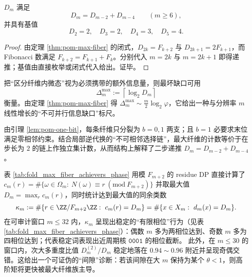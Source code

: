 \begin{corollary}[二步递推与基值]\label{cor:pom-D-rec}
$D_m$ 满足
\[
D_m=D_{m-2}+D_{m-4}\qquad(m\ge 6),
\]
并具有基值
\[
D_2=2,\quad D_3=2,\quad D_4=3,\quad D_5=4.
\]
\end{corollary}
\begin{proof}
由定理 \ref{thm:pom-max-fiber} 的闭式，$D_{2k}=F_{k+2}$ 与 $D_{2k+1}=2F_{k+1}$，而 Fibonacci 数满足 $F_{k+2}=F_{k+1}+F_k$。分别代入 $m=2k$ 与 $m=2k+1$ 即得递推；基值由直接枚举或闭式代入给出。证毕。
\end{proof}

\begin{remark}[最坏投影缺口的比特量化]\label{rem:pom-D-delay}
把“区分纤维内微态”视为必须携带的额外信息量，则最坏缺口可用
\[
\Delta_m^{\max}:=\left\lceil \log_2 D_m\right\rceil
\]
衡量。由定理 \ref{thm:pom-max-fiber} 得
\(
\Delta_m^{\max}\sim \frac{m}{2}\log_2\varphi
\)，它给出一种与分辨率 $m$ 线性增长的“不可并行信息缺口”标尺。
\end{remark}

\begin{remark}[一比特溢出与二步递推的结构来源]\label{rem:pom-overflow-rec}
由引理 \ref{lem:pom-one-bit}，每条纤维只分裂为 $b=0,1$ 两支；且 $b=1$ 必要求末位满足零相邻约束。结合局部逆代换的“不可相邻选择链”，最大纤维的计数等价于在步长为 $2$ 的链上作独立集计数，从而结构上解释了二步递推 $D_m=D_{m-2}+D_{m-4}$。
\end{remark}




\begin{remark}\label{rem:pom-max-fiber-achievers-phase}
表 \ref{tab:fold_max_fiber_achievers_phase} 用模 \(F_{m+2}\) 的 residue DP 直接计算了
\(
c_m(r)=\#\{\omega\in\Omega_m:\ N(\omega)\equiv r\ (\mathrm{mod}\ F_{m+2})\}
\)
并取最大值 \(D_m=\max_r c_m(r)\)，同时统计达到最大值的同余类数
\[
\kappa_m:=\#\{r\in\ZZ/F_{m+2}\ZZ:\ c_m(r)=D_m\}
=\#\{x\in X_m:\ d_m(x)=D_m\}.
\]
在可审计窗口 \(m\le 32\) 内，\(\kappa_m\) 呈现出稳定的“有限相位”行为（见表 \ref{tab:fold_max_fiber_achievers_phase}）：偶数 \(m\) 多为两相位达到、奇数 \(m\) 多为四相位达到；代表稳定词表现出近周期核 \(\texttt{0001}\) 的相位截断。
此外，在 \(m\le 30\) 的窗口内，次大多重度比值 \(D_m^{(2)}/D_m\) 稳定地落在 \(0.94\sim 0.96\) 附近并呈现奇偶交错。这给出一个可证伪的“间隙”诊断：若该间隙在大 \(m\) 保持为某个 \(\theta<1\)，则高阶矩将更快被最大纤维族主导。
\end{remark}

